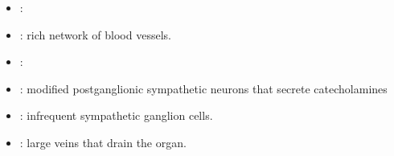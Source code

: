 \begin{multicols}{2}
\begin{itemize}
  \begin{center}
  \end{center}
  
  \item {}: 
  
  \begin{center}
  \end{center}

  \item {}: rich network of blood vessels.
  
  \begin{center}
  \end{center}
  
  \item {}: 
  
  \begin{center}
  \end{center}
  
  \item {}:  modified postganglionic sympathetic neurons that secrete catecholamines 
  
  \begin{center}
  \end{center}
  
  \item {}:  infrequent sympathetic ganglion cells.
  
  \begin{center}
  \end{center}
  
  \item {}: large veins that drain the organ.
  
  \begin{center}
  \end{center}
  
\end{itemize}
\end{multicols}


